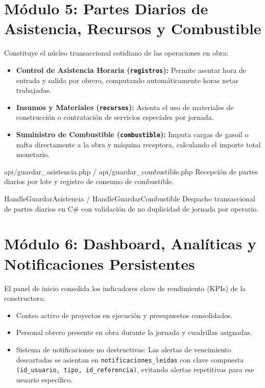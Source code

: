 \documentclass[11pt,a4paper,openany]{report}
\begin{document}
\electricsep

\section{Módulo 5: Partes Diarios de Asistencia, Recursos y Combustible}

Constituye el núcleo transaccional cotidiano de las operaciones en obra:
\begin{itemize}[leftmargin=1.5em]
    \item \textbf{Control de Asistencia Horaria (\texttt{registros}):} Permite asentar hora de entrada y salida por obrero, computando automáticamente horas netas trabajadas.
    \item \textbf{Insumos y Materiales (\texttt{recursos}):} Asienta el uso de materiales de construcción o contratación de servicios especiales por jornada.
    \item \textbf{Suministro de Combustible (\texttt{combustible}):} Imputa cargas de gasoil o nafta directamente a la obra y máquina receptora, calculando el importe total monetario.
\end{itemize}

\begin{apibox}{api/guardar\_asistencia.php / api/guardar\_combustible.php}
    Recepción de partes diarios por lote y registro de consumo de combustible.
\end{apibox}

\begin{methodbox}{HandleGuardarAsistencia / HandleGuardarCombustible}
    Despacho transaccional de partes diarios en C\# con validación de no duplicidad de jornada por operario.
\end{methodbox}

\electricsep

\section{Módulo 6: Dashboard, Analíticas y Notificaciones Persistentes}

El panel de inicio consolida los indicadores clave de rendimiento (KPIs) de la constructora:
\begin{itemize}[leftmargin=1.5em]
    \item Conteo activo de proyectos en ejecución y presupuestos consolidados.
    \item Personal obrero presente en obra durante la jornada y cuadrillas asignadas.
    \item Sistema de notificaciones no destructivas: Las alertas de vencimiento descartadas se asientan en \texttt{notificaciones\_leidas} con clave compuesta \texttt{(id\_usuario, tipo, id\_referencia)}, evitando alertas repetitivas para ese usuario específico.
\end{itemize}
\end{document}
